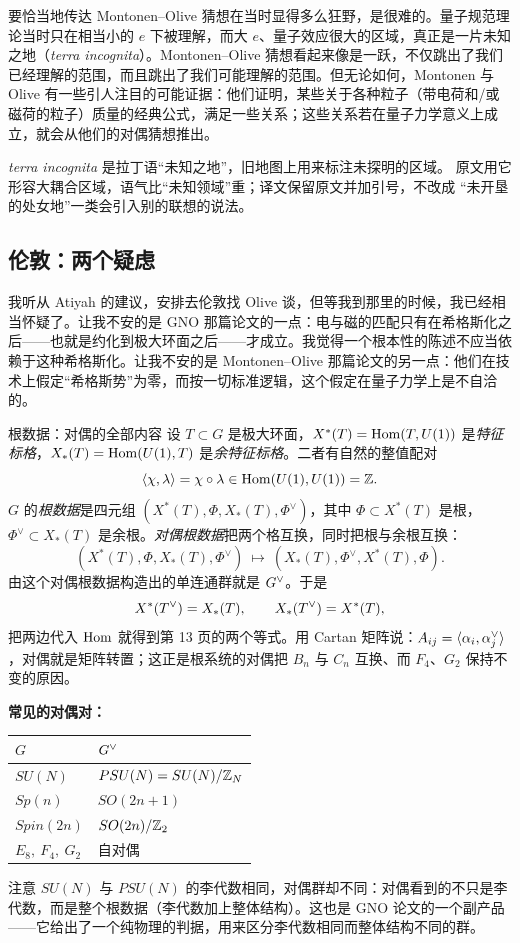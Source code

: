 要恰当地传达 Montonen--Olive 猜想在当时显得多么狂野，是很难的。量子规范理论当时只在相当小的 $e$ 下被理解，而大 $e$、量子效应很大的区域，真正是一片未知之地（\emph{terra incognita}）。Montonen--Olive 猜想看起来像是一跃，不仅跳出了我们已经理解的范围，而且跳出了我们可能理解的范围。但无论如何，Montonen 与 Olive 有一些引人注目的可能证据：他们证明，某些关于各种粒子（带电荷和/或磁荷的粒子）质量的经典公式，满足一些关系；这些关系若在量子力学意义上成立，就会从他们的对偶猜想推出。

\begin{yizhu}
\textit{terra incognita} 是拉丁语“未知之地”，旧地图上用来标注未探明的区域。
原文用它形容大耦合区域，语气比“未知领域”重；译文保留原文并加引号，不改成
“未开垦的处女地”一类会引入别的联想的说法。
\end{yizhu}


\subsection{伦敦：两个疑虑}

我听从 Atiyah 的建议，安排去伦敦找 Olive 谈，但等我到那里的时候，我已经相当怀疑了。让我不安的是 GNO 那篇论文的一点：电与磁的匹配只有在希格斯化之后——也就是约化到极大环面之后——才成立。我觉得一个根本性的陈述不应当依赖于这种希格斯化。让我不安的是 Montonen--Olive 那篇论文的另一点：他们在技术上假定“希格斯势”为零，而按一切标准逻辑，这个假定在量子力学上是不自洽的。

\begin{pizhu}{根数据：对偶的全部内容}
设 $T\subset G$ 是极大环面，$X^*(T)=\operatorname{Hom}(T,U(1))$ 是\emph{特征标格}，$X_*(T)=\operatorname{Hom}(U(1),T)$ 是\emph{余特征标格}。二者有自然的整值配对
\[
  \langle \chi,\lambda\rangle=\chi\circ\lambda\in\operatorname{Hom}(U(1),U(1))=\mathbb{Z} .
\]
$G$ 的\emph{根数据}是四元组 $(X^*(T),\Phi,X_*(T),\Phi^\vee)$，其中 $\Phi\subset X^*(T)$ 是根，$\Phi^\vee\subset X_*(T)$ 是余根。\emph{对偶根数据}把两个格互换，同时把根与余根互换：
\[
  (X^*(T),\Phi,X_*(T),\Phi^\vee)\ \longmapsto\ (X_*(T),\Phi^\vee,X^*(T),\Phi).
\]
由这个对偶根数据构造出的单连通群就是 $G^{\vee}$。于是
\[
  X^*(T^{\vee})=X_*(T),\qquad X_*(T^{\vee})=X^*(T),
\]
把两边代入 $\operatorname{Hom}$ 就得到第 13 页的两个等式。用 Cartan 矩阵说：$A_{ij}=\langle \alpha_i,\alpha_j^\vee\rangle$，对偶就是矩阵转置；这正是根系统的对偶把 $B_n$ 与 $C_n$ 互换、而 $F_4$、$G_2$ 保持不变的原因。

\smallskip
\noindent\textbf{常见的对偶对：}
\begin{center}\small
\begin{tabular}{@{}ll@{}}
\toprule
$G$ & $G^{\vee}$ \\
\midrule
$SU(N)$ & $PSU(N)=SU(N)/\mathbb{Z}_N$ \\
$Sp(n)$ & $SO(2n+1)$ \\
$Spin(2n)$ & $SO(2n)/\mathbb{Z}_2$ \\
$E_8,\ F_4,\ G_2$ & 自对偶 \\
\bottomrule
\end{tabular}
\end{center}
注意 $SU(N)$ 与 $PSU(N)$ 的李代数相同，对偶群却不同：对偶看到的不只是李代数，而是整个根数据（李代数加上整体结构）。这也是 GNO 论文的一个副产品——它给出了一个纯物理的判据，用来区分李代数相同而整体结构不同的群。
\end{pizhu}

